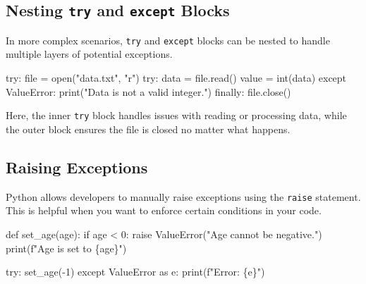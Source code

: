 \documentclass[
  letterpaper,
  DIV=11,
  numbers=noendperiod]{scrreprt}
\newenvironment{Shaded}{\begin{snugshade}}{\end{snugshade}}
\newcommand{\BuiltInTok}[1]{\textcolor[rgb]{0.00,0.23,0.31}{#1}}
\newcommand{\ControlFlowTok}[1]{\textcolor[rgb]{0.00,0.23,0.31}{#1}}
\newcommand{\DecValTok}[1]{\textcolor[rgb]{0.68,0.00,0.00}{#1}}
\newcommand{\ImportTok}[1]{\textcolor[rgb]{0.00,0.46,0.62}{#1}}
\newcommand{\KeywordTok}[1]{\textcolor[rgb]{0.00,0.23,0.31}{#1}}
\newcommand{\NormalTok}[1]{\textcolor[rgb]{0.00,0.23,0.31}{#1}}
\newcommand{\OperatorTok}[1]{\textcolor[rgb]{0.37,0.37,0.37}{#1}}
\newcommand{\PreprocessorTok}[1]{\textcolor[rgb]{0.68,0.00,0.00}{#1}}
\newcommand{\SpecialCharTok}[1]{\textcolor[rgb]{0.37,0.37,0.37}{#1}}
\newcommand{\SpecialStringTok}[1]{\textcolor[rgb]{0.13,0.47,0.30}{#1}}
\newcommand{\StringTok}[1]{\textcolor[rgb]{0.13,0.47,0.30}{#1}}
\begin{document}
\hypertarget{nesting-try-and-except-blocks}{%
\subsection{\texorpdfstring{Nesting \texttt{try} and \texttt{except}
Blocks}{Nesting try and except Blocks}}\label{nesting-try-and-except-blocks}}

In more complex scenarios, \texttt{try} and \texttt{except} blocks can
be nested to handle multiple layers of potential exceptions.

\begin{Shaded}
\begin{Highlighting}[]
\ControlFlowTok{try}\NormalTok{:}
    \BuiltInTok{file} \OperatorTok{=} \BuiltInTok{open}\NormalTok{(}\StringTok{"data.txt"}\NormalTok{, }\StringTok{"r"}\NormalTok{)}
    \ControlFlowTok{try}\NormalTok{:}
\NormalTok{        data }\OperatorTok{=} \BuiltInTok{file}\NormalTok{.read()}
\NormalTok{        value }\OperatorTok{=} \BuiltInTok{int}\NormalTok{(data)}
    \ControlFlowTok{except} \PreprocessorTok{ValueError}\NormalTok{:}
        \BuiltInTok{print}\NormalTok{(}\StringTok{"Data is not a valid integer."}\NormalTok{)}
\ControlFlowTok{finally}\NormalTok{:}
    \BuiltInTok{file}\NormalTok{.close()}
\end{Highlighting}
\end{Shaded}

Here, the inner \texttt{try} block handles issues with reading or
processing data, while the outer block ensures the file is closed no
matter what happens.

\hypertarget{raising-exceptions}{%
\subsection{Raising Exceptions}\label{raising-exceptions}}

Python allows developers to manually raise exceptions using the
\texttt{raise} statement. This is helpful when you want to enforce
certain conditions in your code.

\begin{Shaded}
\begin{Highlighting}[]
\KeywordTok{def}\NormalTok{ set\_age(age):}
    \ControlFlowTok{if}\NormalTok{ age }\OperatorTok{\textless{}} \DecValTok{0}\NormalTok{:}
        \ControlFlowTok{raise} \PreprocessorTok{ValueError}\NormalTok{(}\StringTok{"Age cannot be negative."}\NormalTok{)}
    \BuiltInTok{print}\NormalTok{(}\SpecialStringTok{f"Age is set to }\SpecialCharTok{\{}\NormalTok{age}\SpecialCharTok{\}}\SpecialStringTok{"}\NormalTok{)}

\ControlFlowTok{try}\NormalTok{:}
\NormalTok{    set\_age(}\OperatorTok{{-}}\DecValTok{1}\NormalTok{)}
\ControlFlowTok{except} \PreprocessorTok{ValueError} \ImportTok{as}\NormalTok{ e:}
    \BuiltInTok{print}\NormalTok{(}\SpecialStringTok{f"Error: }\SpecialCharTok{\{}\NormalTok{e}\SpecialCharTok{\}}\SpecialStringTok{"}\NormalTok{)}
\end{Highlighting}
\end{Shaded}
\end{document}
